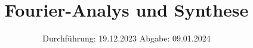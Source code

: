

\subject{V351}
\title{Fourier-Analys und Synthese}
\date{%
  Durchführung: 19.12.2023
  \hspace{3em}
  Abgabe: 09.01.2024
}



\maketitle
\thispagestyle{empty}
\tableofcontents
\newpage






\printbibliography{}
\appendix
\setcounter{secnumdepth}{0}

